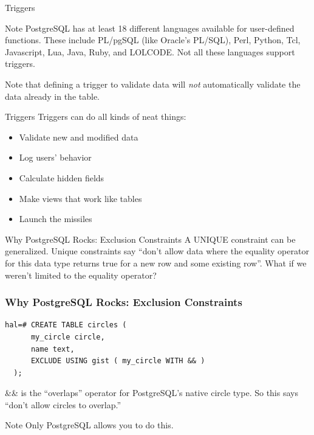 \documentclass{beamer}
\begin{document}
\begin{frame}{Triggers}
    \begin{block}{Note}
        PostgreSQL has at least 18 different languages available for
        user-defined functions. These include PL/pgSQL (like Oracle's PL/SQL),
        Perl, Python, Tcl, Javascript, Lua, Java, Ruby, and LOLCODE. Not all
        these languages support triggers.
    \end{block}
    \vspace{0.1\textheight}

    Note that defining a trigger to validate data will \emph{not} automatically validate the data already in the table.
\end{frame}

\begin{frame}{Triggers}
    Triggers can do all kinds of neat things:
    \begin{itemize}
        \item Validate new and modified data
        \item Log users' behavior
        \item Calculate hidden fields
        \item Make views that work like tables
        \item Launch the missiles
    \end{itemize}
\end{frame}

\begin{frame}{Why PostgreSQL Rocks: Exclusion Constraints}
    A UNIQUE constraint can be generalized. Unique constraints say ``don't allow
    data where the equality operator for this data type returns true for a new
    row and some existing row''. What if we weren't limited to the equality
    operator?
\end{frame}

\begin{frame}[fragile]
    \frametitle{Why PostgreSQL Rocks: Exclusion Constraints}
    \begin{Verbatim}[fontfamily=courier]
  hal=# CREATE TABLE circles (
      my_circle circle,
      name text,
      EXCLUDE USING gist ( my_circle WITH && )
  );
    \end{Verbatim}
    \vspace{2px}
    \&\& is the ``overlaps'' operator for PostgreSQL's native circle type. So this says ``don't allow circles to overlap.''

    \begin{block}{Note}
        Only PostgreSQL allows you to do this.
    \end{block}
\end{frame}
\end{document}
